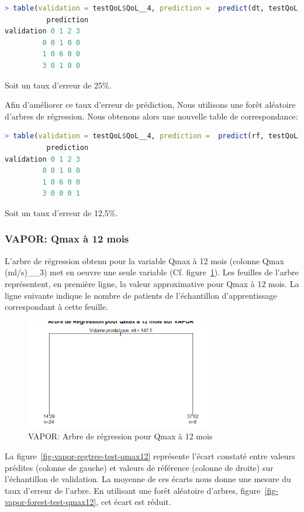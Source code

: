 \begin{lstlisting}[language=R]
> table(validation = testQoL$QoL__4, prediction =  predict(dt, testQoL, type="class"))
          prediction
validation 0 1 2 3
         0 0 1 0 0
         1 0 6 0 0
         3 0 1 0 0
\end{lstlisting}
Soit un taux d'erreur de 25\%.

Afin d'améliorer ce taux d'erreur de prédiction, Nous utilisons une forêt aléatoire d'arbres de régression. Nous obtenons alors une nouvelle table de correspondance:

\begin{lstlisting}[language=R]
> table(validation = testQoL$QoL__4, prediction =  predict(rf, testQoL))
          prediction
validation 0 1 2 3
         0 0 1 0 0
         1 0 6 0 0
         3 0 0 0 1
\end{lstlisting}
Soit un taux d'erreur de 12,5\%.


\subsubsection{VAPOR: Qmax à 12 mois}

L'arbre de régression obtenu pour la variable Qmax à 12 mois (colonne Qmax (ml/s)\_\_3) met en oeuvre une seule variable (Cf. figure~\ref{fig-vapor-regtree-qmax12}). Les feuilles de l'arbre représentent, en première ligne, la valeur approximative pour Qmax à 12 mois. La ligne suivante indique le nombre de patients de l'échantillon d'apprentissage correspondant à cette feuille. 

\begin{figure}[H]
\centering
\includegraphics[width=0.75\textwidth]{../Fig/VAPOR/vapor-regtree-qmax12.png}
\caption{VAPOR: Arbre de régression pour Qmax à 12 mois}
\label{fig-vapor-regtree-qmax12}
\end{figure}

La figure~\ref{fig-vapor-regtree-test-qmax12} représente l'écart constaté entre valeurs prédites (colonne de gauche) et valeurs de référence (colonne de droite) sur l'échantillon de validation. La moyenne de ces écarts nous donne une mesure du taux d'erreur de l'arbre. En utilisant une forêt aléatoire d'arbres, figure~\ref{fig-vapor-forest-test-qmax12}, cet écart est réduit.

